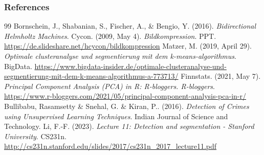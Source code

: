 \documentclass[11pt,compress,t,notes=noshow, xcolor=table]{beamer}
\begin{document}
\begin{vbframe}
\frametitle{References}
\footnotesize{
\begin{thebibliography}{99}
 Bornschein, J., Shabanian, S., Fischer, A., \& Bengio, Y. (2016). \textit{Bidirectional Helmholtz Machines}.
 Cycon. (2009, May 4). \textit{Bildkompression}. PPT. \url{https://de.slideshare.net/hcycon/bildkompression} 
 Matzer, M. (2019, April 29). \textit{Optimale clusteranalyse und segmentierung mit dem k-means-algorithmus}. BigData. \url{https://www.bigdata-insider.de/optimale-clusteranalyse-und-segmentierung-mit-dem-k-means-algorithmus-a-773713/}
 Finnstats. (2021, May 7). \textit{Principal Component Analysis (PCA) in R: R-bloggers. R-bloggers}. \url{https://www.r-bloggers.com/2021/05/principal-component-analysis-pca-in-r/} 
 Bullibabu, Rasamsetty \& Snehal, G. \& Kiran, P.. (2016). \textit{Detection of Crimes using Unsupervised Learning Techniques}. Indian Journal of Science and Technology. 
 Li, F.-F. (2023). \textit{Lecture 11: Detection and segmentation - Stanford University}. CS231n. \url{http://cs231n.stanford.edu/slides/2017/cs231n_2017_lecture11.pdf}

\end{thebibliography}
}
\end{vbframe}



\endlecture
\end{document}
